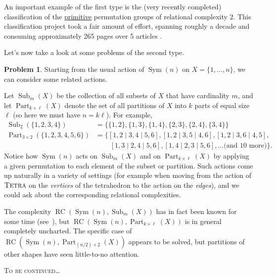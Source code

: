 \documentclass[11pt]{amsart}
\theoremstyle{plain}
\theoremstyle{definition}
\newtheorem*{problem*}{Problem}
\theoremstyle{remark}
\DeclareMathOperator{\Sym}{Sym}
\DeclareMathOperator{\Sub}{Sub}
\DeclareMathOperator{\Part}{Part}
\newcommand{\symtetra}{\textsc{Tetra}}
\DeclareMathOperator{\rc}{RC}
\begin{document}
An important example of the first type is the (very recently completed) classification of the \href{https://en.wikipedia.org/wiki/Primitive_permutation_group}{primitive} permutation groups of relational complexity $2$. This classification project took a fair amount of effort, spanning roughly a decade and consuming approximately 265 pages over 5 articles \cite{ChG16,WiJ16b, GiSp17,DGS18,GLS21}. 

Let's now take a look at some problems of the second type.

\begin{problem*}
Starting from the usual action of $\Sym(n)$ on $X=\{1,\ldots,n\}$, we can consider some related actions. 

Let $\Sub_m(X)$ be the collection of all subsets of $X$ that have cardinality $m$, and let $\Part_{k\times \ell}(X)$ denote the set of all partitions of $X$ into $k$ parts of equal size $\ell$ (so here we must have $n=k\ell$). For example, 
\begin{align*}
\Sub_2(\{1,2,3,4\}) &= \{ \{1,2\}, \{1,3\}, \{1,4\}, \{2,3\}, \{2,4\}, \{3,4\}\}\\
\Part_{3\times 2}(\{1,2,3,4,5,6\}) & = \{ [1,2\mid3,4\mid5,6],[1,2\mid3,5\mid4,6],[1,2\mid3,6\mid4,5],\\
& \phantom{ = \{ }\; [1,3\mid2,4\mid5,6], [1,4\mid2,3\mid5,6], \ldots \text{(and $10$ more)}\}.
\end{align*}
Notice how $\Sym(n)$ acts on $\Sub_m(X)$ and on $\Part_{k\times \ell}(X)$ by applying a given permutation to each element of the subset or partition. Such actions come up naturally in a variety of settings (for example when moving from the action of $\symtetra$ on the \emph{vertices} of the tetrahedron to the action on the \emph{edges}), and we could ask about the corresponding relational complexities. 

The complexity $\rc(\Sym(n),\Sub_m(X))$ has in fact been known for some time (see~\cite[Theorem~2]{CMS96}), but $\rc(\Sym(n),\Part_{k\times \ell}(X))$ is in general completely uncharted. The specific case of  $\rc(\Sym(n),\Part_{(n/2)\times 2}(X))$ appears to be solved, but partitions of other shapes have seen little-to-no attention. 
\end{problem*}



\begin{center}
    \textsc{To be continued}\dots
\end{center}

\newpage



\end{document}
